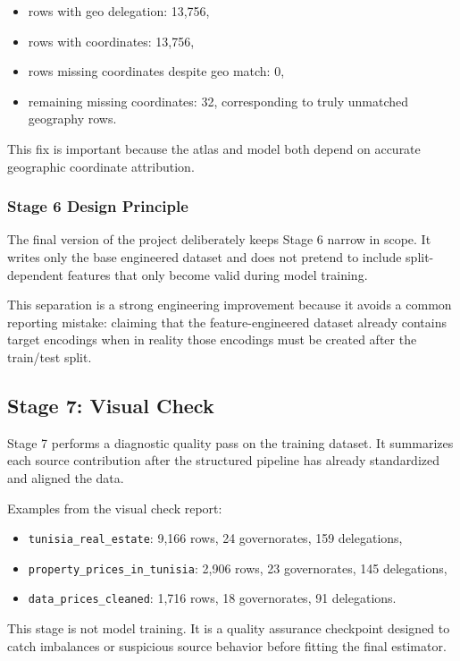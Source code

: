\documentclass[11pt,a4paper]{article}
\newcommand{\code}[1]{\texttt{#1}}
\begin{document}
\begin{itemize}
\item rows with geo delegation: 13,756,
\item rows with coordinates: 13,756,
\item rows missing coordinates despite geo match: 0,
\item remaining missing coordinates: 32, corresponding to truly unmatched geography rows.
\end{itemize}

This fix is important because the atlas and model both depend on accurate geographic coordinate attribution.

\subsubsection{Stage 6 Design Principle}

The final version of the project deliberately keeps Stage 6 narrow in scope. It writes only the base engineered dataset and does not pretend to include split-dependent features that only become valid during model training.

This separation is a strong engineering improvement because it avoids a common reporting mistake: claiming that the feature-engineered dataset already contains target encodings when in reality those encodings must be created after the train/test split.

\subsection{Stage 7: Visual Check}

Stage 7 performs a diagnostic quality pass on the training dataset. It summarizes each source contribution after the structured pipeline has already standardized and aligned the data.

Examples from the visual check report:

\begin{itemize}
\item \code{tunisia\_real\_estate}: 9,166 rows, 24 governorates, 159 delegations,
\item \code{property\_prices\_in\_tunisia}: 2,906 rows, 23 governorates, 145 delegations,
\item \code{data\_prices\_cleaned}: 1,716 rows, 18 governorates, 91 delegations.
\end{itemize}

This stage is not model training. It is a quality assurance checkpoint designed to catch imbalances or suspicious source behavior before fitting the final estimator.
\end{document}

